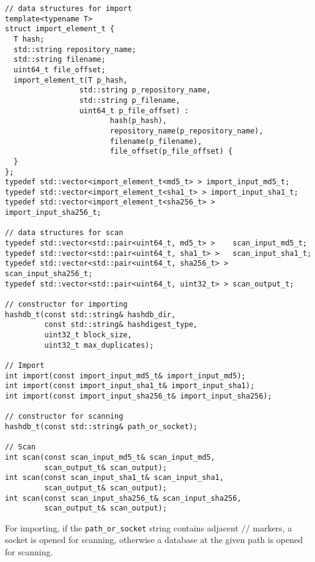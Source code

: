 \documentclass[12pt,twoside]{article}
\begin{document}
\begin{small}
\begin{verbatim}
// data structures for import
template<typename T>
struct import_element_t {
  T hash;
  std::string repository_name;
  std::string filename;
  uint64_t file_offset;
  import_element_t(T p_hash,
                 std::string p_repository_name,
                 std::string p_filename,
                 uint64_t p_file_offset) :
                        hash(p_hash),
                        repository_name(p_repository_name),
                        filename(p_filename),
                        file_offset(p_file_offset) {
  }
};
typedef std::vector<import_element_t<md5_t> > import_input_md5_t;
typedef std::vector<import_element_t<sha1_t> > import_input_sha1_t;
typedef std::vector<import_element_t<sha256_t> > import_input_sha256_t;

// data structures for scan
typedef std::vector<std::pair<uint64_t, md5_t> >    scan_input_md5_t;
typedef std::vector<std::pair<uint64_t, sha1_t> >   scan_input_sha1_t;
typedef std::vector<std::pair<uint64_t, sha256_t> > scan_input_sha256_t;
typedef std::vector<std::pair<uint64_t, uint32_t> > scan_output_t;

// constructor for importing
hashdb_t(const std::string& hashdb_dir,
         const std::string& hashdigest_type,
         uint32_t block_size,
         uint32_t max_duplicates);

// Import
int import(const import_input_md5_t& import_input_md5);
int import(const import_input_sha1_t& import_input_sha1);
int import(const import_input_sha256_t& import_input_sha256);

// constructor for scanning
hashdb_t(const std::string& path_or_socket);

// Scan
int scan(const scan_input_md5_t& scan_input_md5,
         scan_output_t& scan_output);
int scan(const scan_input_sha1_t& scan_input_sha1,
         scan_output_t& scan_output);
int scan(const scan_input_sha256_t& scan_input_sha256,
         scan_output_t& scan_output);
\end{verbatim}
\end{small}

For importing, if the \texttt{path\_or\_socket} string
contains adjacent // markers, a socket is opened for scanning,
otherwise a database at the given path is opened for scanning.
\end{document}
